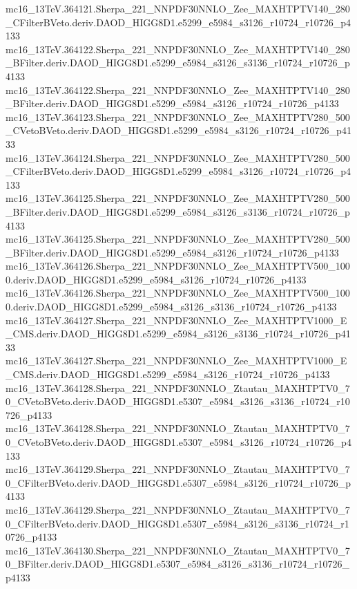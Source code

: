 mc16_13TeV.364121.Sherpa_221_NNPDF30NNLO_Zee_MAXHTPTV140_280_CFilterBVeto.deriv.DAOD_HIGG8D1.e5299_e5984_s3126_r10724_r10726_p4133 \\
mc16_13TeV.364122.Sherpa_221_NNPDF30NNLO_Zee_MAXHTPTV140_280_BFilter.deriv.DAOD_HIGG8D1.e5299_e5984_s3126_s3136_r10724_r10726_p4133 \\
mc16_13TeV.364122.Sherpa_221_NNPDF30NNLO_Zee_MAXHTPTV140_280_BFilter.deriv.DAOD_HIGG8D1.e5299_e5984_s3126_r10724_r10726_p4133 \\
mc16_13TeV.364123.Sherpa_221_NNPDF30NNLO_Zee_MAXHTPTV280_500_CVetoBVeto.deriv.DAOD_HIGG8D1.e5299_e5984_s3126_r10724_r10726_p4133 \\
mc16_13TeV.364124.Sherpa_221_NNPDF30NNLO_Zee_MAXHTPTV280_500_CFilterBVeto.deriv.DAOD_HIGG8D1.e5299_e5984_s3126_r10724_r10726_p4133 \\
mc16_13TeV.364125.Sherpa_221_NNPDF30NNLO_Zee_MAXHTPTV280_500_BFilter.deriv.DAOD_HIGG8D1.e5299_e5984_s3126_s3136_r10724_r10726_p4133 \\
mc16_13TeV.364125.Sherpa_221_NNPDF30NNLO_Zee_MAXHTPTV280_500_BFilter.deriv.DAOD_HIGG8D1.e5299_e5984_s3126_r10724_r10726_p4133 \\
mc16_13TeV.364126.Sherpa_221_NNPDF30NNLO_Zee_MAXHTPTV500_1000.deriv.DAOD_HIGG8D1.e5299_e5984_s3126_r10724_r10726_p4133 \\
mc16_13TeV.364126.Sherpa_221_NNPDF30NNLO_Zee_MAXHTPTV500_1000.deriv.DAOD_HIGG8D1.e5299_e5984_s3126_s3136_r10724_r10726_p4133 \\
mc16_13TeV.364127.Sherpa_221_NNPDF30NNLO_Zee_MAXHTPTV1000_E_CMS.deriv.DAOD_HIGG8D1.e5299_e5984_s3126_s3136_r10724_r10726_p4133 \\
mc16_13TeV.364127.Sherpa_221_NNPDF30NNLO_Zee_MAXHTPTV1000_E_CMS.deriv.DAOD_HIGG8D1.e5299_e5984_s3126_r10724_r10726_p4133 \\
mc16_13TeV.364128.Sherpa_221_NNPDF30NNLO_Ztautau_MAXHTPTV0_70_CVetoBVeto.deriv.DAOD_HIGG8D1.e5307_e5984_s3126_s3136_r10724_r10726_p4133 \\
mc16_13TeV.364128.Sherpa_221_NNPDF30NNLO_Ztautau_MAXHTPTV0_70_CVetoBVeto.deriv.DAOD_HIGG8D1.e5307_e5984_s3126_r10724_r10726_p4133 \\
mc16_13TeV.364129.Sherpa_221_NNPDF30NNLO_Ztautau_MAXHTPTV0_70_CFilterBVeto.deriv.DAOD_HIGG8D1.e5307_e5984_s3126_r10724_r10726_p4133 \\
mc16_13TeV.364129.Sherpa_221_NNPDF30NNLO_Ztautau_MAXHTPTV0_70_CFilterBVeto.deriv.DAOD_HIGG8D1.e5307_e5984_s3126_s3136_r10724_r10726_p4133 \\
mc16_13TeV.364130.Sherpa_221_NNPDF30NNLO_Ztautau_MAXHTPTV0_70_BFilter.deriv.DAOD_HIGG8D1.e5307_e5984_s3126_s3136_r10724_r10726_p4133 \\
